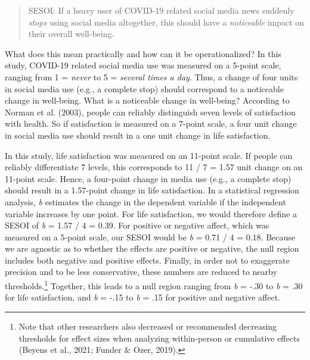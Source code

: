 \documentclass[
  man,mask,floatsintext]{apa7}
\begin{document}
\begin{quote}
SESOI: If a heavy user of COVID-19 related social media news suddenly \emph{stops} using social media altogether, this should have a \emph{noticeable} impact on their overall well-being.
\end{quote}

What does this mean practically and how can it be operationalized?
In this study, COVID-19 related social media use was measured on a 5-point scale, ranging from 1 = \emph{never} to 5 = \emph{several times a day}. Thus, a change of four units in social media use (e.g., a complete stop) should correspond to a noticeable change in well-being.
What is a noticeable change in well-being?
According to Norman et al. (2003), people can reliably distinguish seven levels of satisfaction with health.
So if satisfaction is measured on a 7-point scale, a four unit change in social media use should result in a one unit change in life satisfaction.

In this study, life satisfaction was measured on an 11-point scale.
If people can reliably differentiate 7 levels, this corresponds to 11 / 7 = 1.57 unit change on an 11-point scale.
Hence, a four-point change in media use (e.g., a complete stop) should result in a 1.57-point change in life satisfaction.
In a statistical regression analysis, \emph{b} estimates the change in the dependent variable if the independent variable increases by one point.
For life satisfaction, we would therefore define a SESOI of \emph{b} = 1.57 / 4 = 0.39.
For positive or negative affect, which was measured on a 5-point scale, our SESOI would be \emph{b} = 0.71 / 4 = 0.18.
Because we are agnostic as to whether the effects are positive or negative, the null region includes both negative and positive effects.
Finally, in order not to exaggerate precision and to be less conservative, these numbers are reduced to nearby thresholds.\footnote{Note that other researchers also decreased or recommended decreasing thresholds for effect sizes when analyzing within-person or cumulative effects (Beyens et al., 2021; Funder \& Ozer, 2019).}
Together, this leads to a null region ranging from \emph{b} = -.30 to \emph{b} = .30 for life satisfaction, and \emph{b} = -.15 to \emph{b} = .15 for positive and negative affect.
\end{document}
